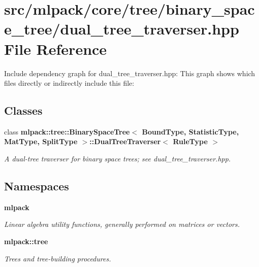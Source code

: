 \section{src/mlpack/core/tree/binary\-\_\-space\-\_\-tree/dual\-\_\-tree\-\_\-traverser.hpp File Reference}
\label{binary__space__tree_2dual__tree__traverser_8hpp}
Include dependency graph for dual\-\_\-tree\-\_\-traverser.\-hpp\-:
This graph shows which files directly or indirectly include this file\-:
\subsection*{Classes}
\begin{DoxyCompactItemize}
\item 
class {\bf mlpack\-::tree\-::\-Binary\-Space\-Tree$<$ Bound\-Type, Statistic\-Type, Mat\-Type, Split\-Type $>$\-::\-Dual\-Tree\-Traverser$<$ Rule\-Type $>$}
\begin{DoxyCompactList}\small\item\em A dual-\/tree traverser for binary space trees; see dual\-\_\-tree\-\_\-traverser.\-hpp. \end{DoxyCompactList}\end{DoxyCompactItemize}
\subsection*{Namespaces}
\begin{DoxyCompactItemize}
\item 
{\bf mlpack}
\begin{DoxyCompactList}\small\item\em Linear algebra utility functions, generally performed on matrices or vectors. \end{DoxyCompactList}\item 
{\bf mlpack\-::tree}
\begin{DoxyCompactList}\small\item\em Trees and tree-\/building procedures. \end{DoxyCompactList}\end{DoxyCompactItemize}
